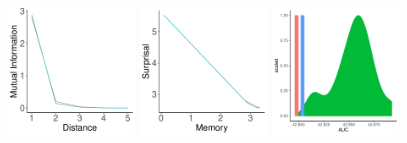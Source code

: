 \documentclass[11pt,letterpaper]{article}
\begin{document}
\begin{figure}
	\begin{center}
		\includegraphics[width=0.3\textwidth]{figures/Japanese-suffixes-byMorphemes-it.pdf}
		\includegraphics[width=0.3\textwidth]{figures/Japanese-suffixes-byMorphemes-memsurp.pdf}
		\includegraphics[width=0.3\textwidth]{figures/Japanese-suffixes-byMorphemes-auc-hist.pdf}


\end{center}
\end{figure}
\end{document}
